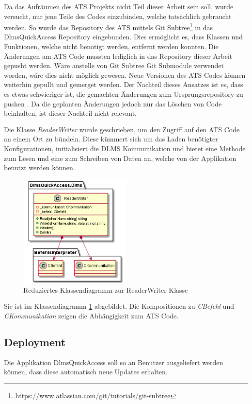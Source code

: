 Da das Aufräumen des \ac{ATS} Projekts nicht Teil dieser Arbeit sein soll, wurde versucht, nur jene Teile des Codes einzubinden, welche tatsächlich gebraucht werden.
So wurde das Repository des \ac{ATS} mittels Git Subtree\footnote{https://www.atlassian.com/git/tutorials/git-subtree} in das DlmsQuickAccess Repository eingebunden. 
Dies ermöglicht es, dass Klassen und Funktionen, welche nicht benötigt werden, entfernt werden konnten.
Die Änderungen am \ac{ATS} Code mussten lediglich in das Repository dieser Arbeit gepusht werden.
Wäre anstelle von Git Subtree Git Submodule verwendet worden, wäre dies nicht möglich gewesen.
Neue Versionen des \ac{ATS} Codes können weiterhin gepullt und gemerget werden. 
Der Nachteil dieses Ansatzes ist es, dass es etwas schwieriger ist, die gemachten Änderungen zum Ursprungsrepository zu pushen \parencite{gitSubtree}.
Da die geplanten Änderungen jedoch nur das Löschen von Code beinhalten, ist dieser Nachteil nicht relevant.

Die Klasse \textit{ReaderWriter} wurde geschrieben, um den Zugriff auf den \ac{ATS} Code an einem Ort zu bündeln.
Diese kümmert sich um das Laden benötigter Konfigurationen, initialisiert die \ac{DLMS} Kommunikation und bietet eine Methode zum Lesen und eine zum Schreiben von Daten an, welche von der Applikation benutzt werden können.
\begin{figure}[H]
   \centering
   \includegraphics[width=0.5\textwidth]{gfx/readerwriter.png}
   \caption{
      Reduziertes Klassendiagramm zur ReaderWriter Klasse
      }
      \label{fig:readerwriter}
\end{figure}
Sie ist im Klassendiagramm \ref{fig:readerwriter} abgebildet.
Die Kompositionen zu \textit{CBefehl} und \textit{CKommunikation} zeigen die Abhängigkeit zum \ac{ATS} Code.



\subsection{Deployment}\label{deployment}
\dq Die Applikation DlmsQuickAccess soll so an Benutzer ausgeliefert werden können, dass diese automatisch neue Updates erhalten.\dq

